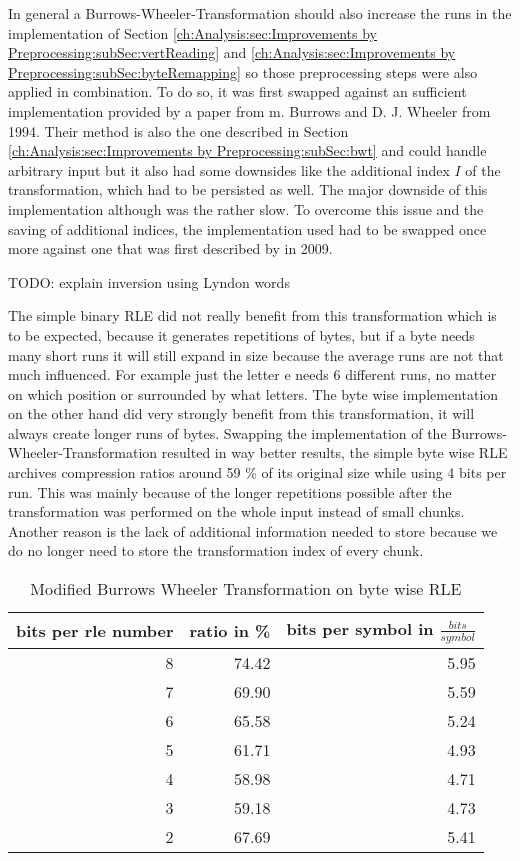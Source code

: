 \par{
In general a Burrows-Wheeler-Transformation should also increase the runs in the implementation of Section \ref{ch:Analysis:sec:Improvements by Preprocessing:subSec:vertReading} and \ref{ch:Analysis:sec:Improvements by Preprocessing:subSec:byteRemapping} so those preprocessing steps were also applied in combination. To do so, it was first swapped against an sufficient implementation provided by a paper from m. Burrows and D. J. Wheeler \cite{Burrows94} from 1994. Their method is also the one described in Section \ref{ch:Analysis:sec:Improvements by Preprocessing:subSec:bwt} and could handle arbitrary input but it also had some downsides like the additional index $I$ of the transformation, which had to be persisted as well. The major downside of this implementation although was the rather slow. To overcome this issue and the saving of additional indices, the implementation used had to be swapped once more against one that was first described by \cite{Burrows-linear-time} in 2009.

TODO: explain inversion using Lyndon words
}
\par{
The simple binary RLE did not really benefit from this transformation which is to be expected, because it generates repetitions of bytes, but if a byte needs many short runs it will still expand in size because the average runs are not that much influenced. For example just the letter e needs 6 different runs, no matter on which position or surrounded by what letters. The byte wise implementation on the other hand did very strongly benefit from this transformation, it will always create longer runs of bytes. Swapping the implementation of the Burrows-Wheeler-Transformation resulted in way better results, the simple byte wise RLE archives compression ratios around 59 \% of its original size while using 4 bits per run. This was mainly because of the longer repetitions possible after the transformation was performed on the whole input instead of small chunks. Another reason is the lack of additional information needed to store because we do no longer need to store the transformation index of every chunk.
	\begin{table}[H]
		\centering
		\begin{tabular}{r|r|r}	
			bits per rle number & ratio in \% & bits per symbol in $\frac{bits}{symbol}$\\
			\hline
			8 & 74.42 & 5.95\\
			7 & 69.90 & 5.59\\
			6 & 65.58 & 5.24\\
			5 & 61.71 & 4.93\\
			4 & 58.98 & 4.71\\
			3 & 59.18 & 4.73\\
			2 & 67.69 & 5.41
		\end{tabular}
		\caption{Modified Burrows Wheeler Transformation on byte wise RLE}
		\label{tab:t12 Modified Burrows Wheeler Transformation on byte wise RLE}
	\end{table}
}
